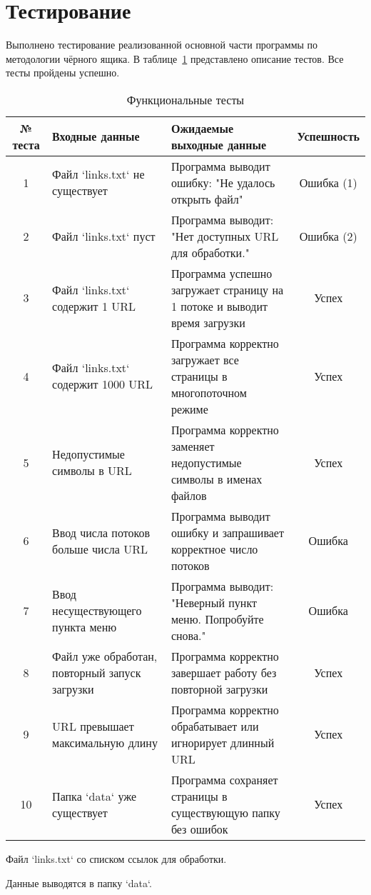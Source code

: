 \section{Тестирование}

\hspace{1.25cm}
Выполнено тестирование реализованной основной части программы по методологии чёрного ящика. В таблице~\ref{tab:tests} представлено описание тестов. Все тесты пройдены успешно.

\begin{table}[h!]
    \centering
    \caption{Функциональные тесты}
    \label{tab:tests}
    \begin{tabularx}{\textwidth}{|c|X|X|c|}
        \hline
        № теста & Входные данные                                  & Ожидаемые выходные данные                                                  & Успешность \\ \hline
        1       & Файл `links.txt` не существует                  & Программа выводит ошибку: "Не удалось открыть файл"                        & Ошибка (1) \\ \hline
        2       & Файл `links.txt` пуст                           & Программа выводит: "Нет доступных URL для обработки."                      & Ошибка (2) \\ \hline
        3       & Файл `links.txt` содержит 1 URL                 & Программа успешно загружает страницу на 1 потоке и выводит время загрузки  & Успех      \\ \hline
        4       & Файл `links.txt` содержит 1000 URL              & Программа корректно загружает все страницы в многопоточном режиме          & Успех      \\ \hline
        5       & Недопустимые символы в URL                      & Программа корректно заменяет недопустимые символы в именах файлов          & Успех      \\ \hline
        6       & Ввод числа потоков больше числа URL             & Программа выводит ошибку и запрашивает корректное число потоков            & Ошибка     \\ \hline
        7       & Ввод несуществующего пункта меню                & Программа выводит: "Неверный пункт меню. Попробуйте снова."                & Ошибка     \\ \hline
        8       & Файл уже обработан, повторный запуск загрузки   & Программа корректно завершает работу без повторной загрузки                & Успех      \\ \hline
        9       & URL превышает максимальную длину                & Программа корректно обрабатывает или игнорирует длинный URL                & Успех      \\ \hline
        10      & Папка `data` уже существует                     & Программа сохраняет страницы в существующую папку без ошибок               & Успех      \\ \hline
    \end{tabularx}
\end{table}

Файл `links.txt` со списком ссылок для обработки.

Данные выводятся в папку `data`.
